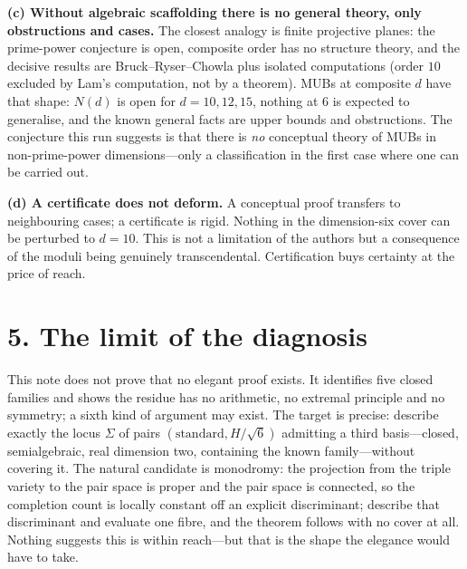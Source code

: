 \documentclass[10pt]{article}
\begin{document}
\textbf{(c) Without algebraic scaffolding there is no general theory, only obstructions and cases.} The
closest analogy is finite projective planes: the prime-power conjecture is open, composite order has no
structure theory, and the decisive results are Bruck--Ryser--Chowla plus isolated computations (order
$10$ excluded by Lam's computation, not by a theorem). MUBs at composite $d$ have that shape: $N(d)$ is
open for $d=10,12,15$, nothing at $6$ is expected to generalise, and the known general facts are upper
bounds and obstructions. The conjecture this run suggests is that there is \emph{no} conceptual theory of
MUBs in non-prime-power dimensions---only a classification in the first case where one can be carried
out.

\textbf{(d) A certificate does not deform.} A conceptual proof transfers to neighbouring cases; a
certificate is rigid. Nothing in the dimension-six cover can be perturbed to $d=10$. This is not a
limitation of the authors but a consequence of the moduli being genuinely transcendental. Certification
buys certainty at the price of reach.

\section*{5. The limit of the diagnosis}

This note does not prove that no elegant proof exists. It identifies five closed families and shows the
residue has no arithmetic, no extremal principle and no symmetry; a sixth kind of argument may exist. The
target is precise: describe exactly the locus $\Sigma$ of pairs $(\text{standard},H/\sqrt6)$ admitting a
third basis---closed, semialgebraic, real dimension two, containing the known family---without covering
it. The natural candidate is monodromy: the projection from the triple variety to the pair space is
proper and the pair space is connected, so the completion count is locally constant off an explicit
discriminant; describe that discriminant and evaluate one fibre, and the theorem follows with no cover at
all. Nothing suggests this is within reach---but that is the shape the elegance would have to take.
\end{document}
